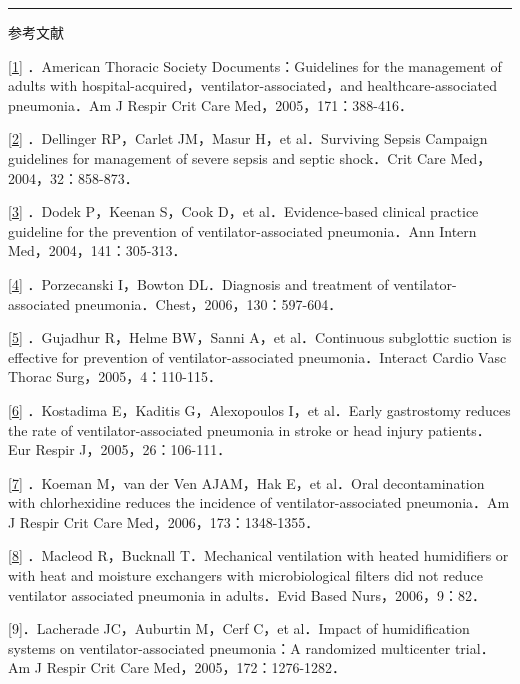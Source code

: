 \begin{center}\rule{0.5\linewidth}{\linethickness}\end{center}

参考文献

\protect\hyperlink{text00014.htmlux5cux23ch1-13-back}{{[}1{]}}
．American Thoracic Society Documents：Guidelines for the management of
adults with hospital-acquired，ventilator-associated，and
healthcare-associated pneumonia．Am J Respir Crit Care
Med，2005，171：388-416．

\protect\hyperlink{text00014.htmlux5cux23ch2-13-back}{{[}2{]}}
．Dellinger RP，Carlet JM，Masur H，et al．Surviving Sepsis Campaign
guidelines for management of severe sepsis and septic shock．Crit Care
Med，2004，32：858-873．

\protect\hyperlink{text00014.htmlux5cux23ch3-13-back}{{[}3{]}} ．Dodek
P，Keenan S，Cook D，et al．Evidence-based clinical practice guideline
for the prevention of ventilator-associated pneumonia．Ann Intern
Med，2004，141：305-313．

\protect\hyperlink{text00014.htmlux5cux23ch4-13-back}{{[}4{]}}
．Porzecanski I，Bowton DL．Diagnosis and treatment of
ventilator-associated pneumonia．Chest，2006，130：597-604．

\protect\hyperlink{text00014.htmlux5cux23ch5-13-back}{{[}5{]}}
．Gujadhur R，Helme BW，Sanni A，et al．Continuous subglottic suction is
effective for prevention of ventilator-associated pneumonia．Interact
Cardio Vasc Thorac Surg，2005，4：110-115．

\protect\hyperlink{text00014.htmlux5cux23ch6-13-back}{{[}6{]}}
．Kostadima E，Kaditis G，Alexopoulos I，et al．Early gastrostomy
reduces the rate of ventilator-associated pneumonia in stroke or head
injury patients．Eur Respir J，2005，26：106-111．

\protect\hyperlink{text00014.htmlux5cux23ch7-13-back}{{[}7{]}} ．Koeman
M，van der Ven AJAM，Hak E，et al．Oral decontamination with
chlorhexidine reduces the incidence of ventilator-associated
pneumonia．Am J Respir Crit Care Med，2006，173：1348-1355．

\protect\hyperlink{text00014.htmlux5cux23ch8-13-back}{{[}8{]}} ．Macleod
R，Bucknall T．Mechanical ventilation with heated humidifiers or with
heat and moisture exchangers with microbiological filters did not reduce
ventilator associated pneumonia in adults．Evid Based
Nurs，2006，9：82．

{[}9{]}．Lacherade JC，Auburtin M，Cerf C，et al．Impact of
humidification systems on ventilator-associated pneumonia：A randomized
multicenter trial．Am J Respir Crit Care Med，2005，172：1276-1282．


